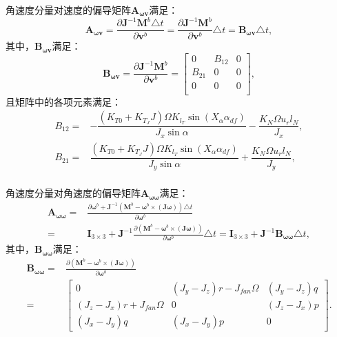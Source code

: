 角速度分量对速度的偏导矩阵$\bm{A}_{\bm{\omega v}}$满足：
\begin{equation}
    \bm{A}_{\bm{\omega v}} = \frac{\partial \bm{J}^{-1} \bm{M}^b \triangle t}{\partial \bm{v}^b} = \frac{\partial \bm{J}^{-1} \bm{M}^b}{\partial \bm{v}^b} \triangle t = \bm{B}_{\bm{\omega v}}\triangle t,
\end{equation}
其中，$\bm{B}_{\bm{\omega v}}$满足：
\begin{equation}
    \bm{B}_{\bm{\omega v}} = \frac{\partial \bm{J}^{-1} \bm{M}^b}{\partial \bm{v}^b} = 
    \begin{bmatrix}
        0 & B_{12} & 0 \\
        B_{21} & 0 & 0 \\
        0 & 0 & 0 \\
    \end{bmatrix},
\end{equation}
且矩阵中的各项元素满足：
\begin{equation}
    \begin{aligned}
        B_{12} =& -\dfrac{(K_{T0} + K_{T_J}J) \Omega K_{l_T} \sin(X_\alpha \alpha_{df}) }{J_x \sin\alpha} - \dfrac{K_{N} \Omega u_r l_N}{J_x}, \\[6pt]
        B_{21} =& \dfrac{(K_{T0} + K_{T_J}J) \Omega K_{l_T} \sin(X_\alpha \alpha_{df}) }{J_y \sin\alpha} + \dfrac{K_{N} \Omega u_r l_N}{J_y}, \\[6pt]
    \end{aligned}
\end{equation}

角速度分量对角速度的偏导矩阵$\bm{A}_{\bm{\omega \omega}}$满足：
\begin{equation}
    \begin{aligned}
        \bm{A}_{\bm{\omega \omega}} =& \frac{\partial \bm{\omega}^b + \bm{J}^{-1} (\bm{M}^b - \bm{\omega}^b \times (\bm{J}\bm{\omega}))\triangle t}{\partial \bm{\omega}^b} \\
        =& \bm{I}_{3 \times 3} + \bm{J}^{-1} \frac{\partial (\bm{M}^b - \bm{\omega}^b \times (\bm{J}\bm{\omega})) }{\partial \bm{\omega}^b} \triangle t = \bm{I}_{3 \times 3} + \bm{J}^{-1} \bm{B}_{\bm{\omega \omega}} \triangle t,
    \end{aligned}
\end{equation}
其中，$\bm{B}_{\bm{\omega \omega}}$满足：
\begin{equation}
    \begin{aligned}
        \bm{B}_{\bm{\omega \omega}} =& \frac{\partial (\bm{M}^b - \bm{\omega}^b \times (\bm{J}\bm{\omega})) }{\partial \bm{\omega}^b} \\
        =& 
        \begin{bmatrix}
            0 & (J_y - J_z) r - J_{fan} \Omega & (J_y - J_z) q \\[8pt]
            (J_z - J_x) r + J_{fan} \Omega & 0 & (J_z - J_x) p \\[8pt]
            (J_x - J_y) q & (J_x - J_y) p & 0
        \end{bmatrix}.
    \end{aligned}
\end{equation}

